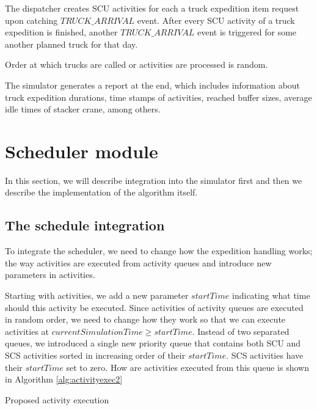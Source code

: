 \documentclass{ctuthesis}
\begin{document}
The dispatcher creates SCU activities for each a truck expedition item request upon catching $TRUCK\_ARRIVAL$ event. After every SCU activity of a truck expedition is finished, another $TRUCK\_ARRIVAL$ event is triggered for some another planned truck for that day.  

Order at which trucks are called or activities are processed is random.

The simulator generates a report at the end, which includes information about truck expedition durations, time stamps of activities, reached buffer sizes, average idle times of stacker crane, among others.

\section{Scheduler module}

In this section, we will describe integration into the simulator first and then we describe the implementation of the algorithm itself.

\subsection{The schedule integration}
\label{subsec:scheduleintegration}

To integrate the scheduler, we need to change how the expedition handling works; the way activities are executed from activity queues and introduce new parameters in activities. 

Starting with activities, we add a new parameter $startTime$ indicating what time should this activity be executed. Since activities of activity queues are executed in random order, we need to change how they work so that we can execute activities at $currentSimulationTime \geq startTime$. Instead of two separated queues,  we introduced a single new priority queue that contains both SCU and SCS activities sorted in increasing order of their $startTime$. SCS activities have their $startTime$ set to zero. How are activities executed from this queue is shown in Algorithm \ref{alg:activityexec2}

\begin{algorithm}[H]
\SetAlgoLined
{
}
\caption{Proposed activity execution}
\label{alg:activityexec2}
\end{algorithm}
\end{document}
